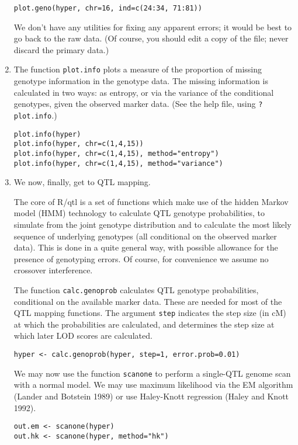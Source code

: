 \documentclass[10pt,letterpaper]{article}
\newcommand{\usercolor}{\color [named]{BlueViolet}}
\begin{document}
\begin{enumerate}
\usercolor
\verb|plot.geno(hyper, chr=16, ind=c(24:34, 71:81))|
\normalcolor

We don't have any utilities for fixing any apparent errors; it would
be best to go back to the raw data.  (Of course, you should edit a
copy of the file; never discard the primary data.)

\item The function \verb-plot.info- plots a measure of the proportion
of missing genotype information in the genotype data.  The missing
information is calculated in two ways: as entropy, or via the
variance of the conditional genotypes, given the observed marker
data.  (See the help file, using \verb-?plot.info-.)  

\usercolor
\verb|plot.info(hyper)| \\
\verb|plot.info(hyper, chr=c(1,4,15))| \\
\verb|plot.info(hyper, chr=c(1,4,15), method="entropy")| \\
\verb|plot.info(hyper, chr=c(1,4,15), method="variance")| 
\normalcolor


\item We now, finally, get to QTL mapping.  

The core of R/qtl is a set of functions which make use of the hidden
Markov model (HMM) technology to calculate QTL genotype probabilities,
to simulate from the joint genotype distribution and to calculate the
most likely sequence of underlying genotypes (all conditional on the
observed marker data).  This is done in a quite general way, with
possible allowance for the presence of genotyping errors.  Of course, 
for convenience we assume no crossover interference.  

The function \verb-calc.genoprob- calculates QTL genotype
probabilities, conditional on the available marker data. These are
needed for most of the QTL mapping functions.  The argument
\verb-step- indicates the step size (in cM) at which the probabilities
are calculated, and determines the step size at which later LOD scores
are calculated.

\usercolor
\verb|hyper <- calc.genoprob(hyper, step=1, error.prob=0.01)| \normalcolor

We may now use the function \verb-scanone- to perform a single-QTL
genome scan with a normal model.  We may use maximum likelihood via
the EM algorithm (Lander and Botstein 1989) or use Haley-Knott
regression (Haley and Knott 1992).

\usercolor
\verb|out.em <- scanone(hyper)| \\
\verb|out.hk <- scanone(hyper, method="hk")|
\normalcolor  


\end{enumerate}
\end{document}
